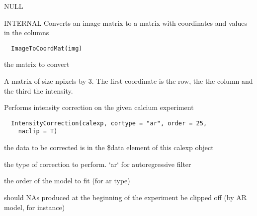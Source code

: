 \documentclass[a4paper]{book}
\begin{document}
%
\begin{Value}
NULL
\end{Value}
%
\begin{Description}\relax
INTERNAL Converts an image matrix to a matrix with
coordinates and values in the columns
\end{Description}
%
\begin{Usage}
\begin{verbatim}
  ImageToCoordMat(img)
\end{verbatim}
\end{Usage}
%
\begin{Arguments}
\begin{ldescription}
\item[\code{img}] the matrix to convert
\end{ldescription}
\end{Arguments}
%
\begin{Value}
A matrix of size npixels-by-3. The first coordinate is
the row, the the column and the third the intensity.
\end{Value}
%
\begin{Description}\relax
Performs intensity correction on the given calcium
experiment
\end{Description}
%
\begin{Usage}
\begin{verbatim}
  IntensityCorrection(calexp, cortype = "ar", order = 25,
    naclip = T)
\end{verbatim}
\end{Usage}
%
\begin{Arguments}
\begin{ldescription}
\item[\code{calexp}] the data to be corrected is in the \$data
element of this calexp object

\item[\code{cortype}] the type of correction to perform.  `ar`
for autoregressive filter

\item[\code{order}] the order of the model to fit (for ar type)

\item[\code{naclip}] should NAs produced at the beginning of the
experiment be clipped off (by AR model, for instance)
\end{ldescription}
\end{Arguments}
\end{document}
